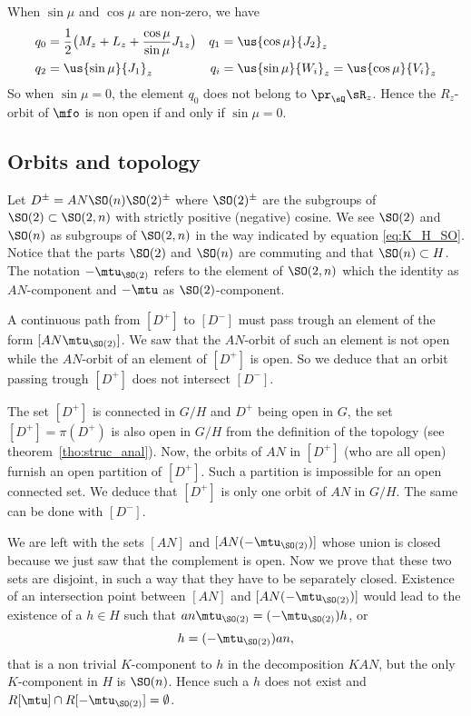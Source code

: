 When $\sin\mu$ and $\cos\mu$ are non-zero, we have
\begin{subequations}
	\begin{align}
		q_0 & =\frac{1}{2}\big(M_z+L_z+\frac{\cos\mu}{\sin\mu}{J_1}_z\big) & q_1 & =\us{\cos\mu}{J_2}_z                     \\
		q_2 & =\us{\sin\mu}{J_1}_z                                         & q_i & =\us{\sin\mu}{W_i}_z=\us{\cos\mu}{V_i}_z
	\end{align}
\end{subequations}
So when $\sin\mu=0$, the element $q_{0}$ does not belong to $\pr_{\sQ}\sR_{z}$. Hence the $R_z$-orbit of $\mfo$ is non open if and only if $\sin \mu=0$.

\subsection{Orbits  and topology}
\label{PgTopoOrb}

Let  $D^{\pm}=AN\SO(n)\SO(2)^{\pm}$ where $\SO(2)^{\pm}$ are the subgroups of $\SO(2)\subset \SO(2,n)$ with strictly positive (negative) cosine. We see $\SO(2)$ and $\SO(n)$ as subgroups of $\SO(2,n)$ in the way indicated by equation \eqref{eq:K_H_SO}. Notice that the parts $\SO(2)$ and $\SO(n)$ are commuting and that $\SO(n)\subset H$. The notation $-\mtu_{\SO(2)}$ refers to the element of $\SO(2,n)$ which the identity as $AN$-component and $-\mtu$ as $\SO(2)$-component.

A continuous path from $[D^+]$ to $[D^-]$ must pass trough an element of the form $[AN\mtu_{\SO(2)}]$. We saw that the $AN$-orbit of such an element is not open while the $AN$-orbit of an element of $[D^+]$ is open. So we deduce that an orbit passing trough $[D^+]$ does not intersect $[D^-]$.

The set $[D^+]$ is connected in $G/H$ and $D^+$  being open in $G$, the set $[D^+]=\pi(D^+)$ is also open in $G/H$ from the definition of the topology (see theorem~\ref{tho:struc_anal}). Now, the orbits of $AN$ in $[D^+]$ (who are all open) furnish an open partition of $[D^+]$. Such a partition is impossible for an open connected set. We deduce that $[D^+]$ is only one orbit of $AN$ in $G/H$. The same can be done with $[D^-]$.

We are left with the sets $[AN]$ and $[AN(-\mtu_{\SO(2)})]$ whose union is closed because we just saw that the complement is open. Now we prove that these two sets are disjoint, in such a way that they have to be separately closed. Existence of an intersection point between $[AN]$ and $[AN(-\mtu_{\SO(2)})]$ would lead to the existence of a $h\in H$ such that $an\mtu_{\SO(2)}=(-\mtu_{\SO(2)})h$, or
\[
	h=(-\mtu_{\SO(2)})an,
\]
that is a non trivial $K$-component to $h$ in the decomposition $KAN$, but the only $K$-component in $H$ is $\SO(n)$. Hence such a $h$ does not exist and $R[\mtu]\cap R[-\mtu_{\SO(2)}]=\emptyset$.

